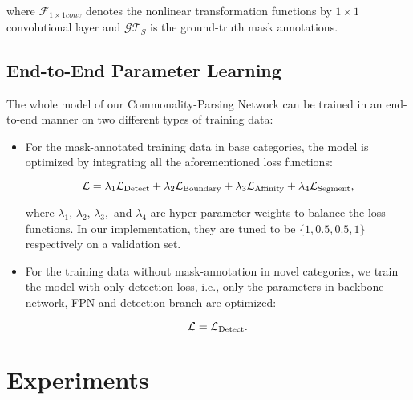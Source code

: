 \documentclass[runningheads]{llncs}
\newcommand{\mymodel}{Commonality-Parsing Network\xspace}
\begin{document}
\vspace{-2mm}\noindent
where $\mathcal{F}_{1\times 1 conv}$ denotes the nonlinear transformation functions by $1\times 1$ convolutional layer and $\mathcal{GT}_{S}$ is the ground-truth mask annotations.

\vspace{-0.1in}
\subsection{End-to-End Parameter Learning}
The whole model of our \mymodel can be trained in an end-to-end manner on two different types of training data:
\vspace{-1mm}
\begin{itemize}
    \item For the mask-annotated training data in base categories, the model is optimized
by integrating all the aforementioned loss functions:
\begin{small}
\begin{equation}
\vspace{-2mm}
    \mathcal{L} = \lambda_1\mathcal{L}_{\text{Detect}} + \lambda_2\mathcal{L}_{\text{Boundary}} + \lambda_3\mathcal{L}_{\text{Affinity}} + \lambda_4\mathcal{L}_{\text{Segment}},
\end{equation}
\end{small}

\vspace{-3mm}\noindent
where $\lambda_1$, $\lambda_2$, $\lambda_3,$ and $\lambda_4$ are hyper-parameter weights to balance the loss functions. In our implementation, they are tuned to be $\{1, 0.5, 0.5, 1\}$ respectively on a validation set. 
\item For the training data without mask-annotation in novel categories, we train the model with only detection loss, i.e., only the parameters in backbone network, FPN and detection branch are optimized:
\begin{small}
\begin{equation}
\vspace{-2mm}
    \mathcal{L} = \mathcal{L}_{\text{Detect}}.
\end{equation}
\end{small}
\end{itemize}

\vspace{-5mm}



\section{Experiments}
\vspace{-0.05in}
\end{document}
